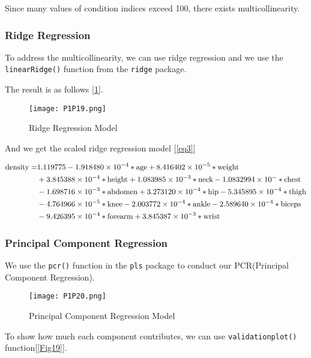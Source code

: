 \documentclass[11pt]{article}
\begin{document}
Since many values of condition indices exceed 100, there exists multicollinearity.

\subsubsection{Ridge Regression}

To address the multicollinearity, we can use ridge regression and we use the \verb|linearRidge()| function from the \verb|ridge| package.

The result is as follows [\ref{Fig16}].

\begin{figure}[!htb]
\centering
\texttt{[image: P1P19.png]}
\caption{Ridge Regression Model}\label{Fig16}
\end{figure}

And we get the scaled ridge regression model [\ref{eq3}]
           
\begin{align}
	\text{density} = &1.119775-1.918480\times10^{-4} *\text{age}+8.416402\times 10^{-5}*\text{weight}\notag\\
	&+3.845388\times 10^{-4}*\text{height}+1.083985\times 10^{-3}*\text{neck}-1.0832994\times 10^{-} *\text{chest}\notag\\
	&-1.698716\times 10^{-3} *\text{abdomen}+3.273120\times 10^{-4}*\text{hip}-5.345895\times 10^{-4}*\text{thigh}\notag \\ 
    &-4.764966\times10^{-5}*\text{knee} -2.003772\times10^{-4}*\text{ankle}-2.589640\times 10^{-4}*\text{biceps}\notag\\
    &-9.426395\times 10^{-4}*\text{forearm}+3.845387\times10^{-3}*\text{wrist}\label{eq3}  
\end{align}


\subsubsection{Principal Component Regression}

We use the \verb|pcr()| function in the \verb|pls| package to conduct our PCR(Principal Component Regression).

\begin{figure}[!htb]
\centering
\texttt{[image: P1P20.png]}
\caption{Principal Component Regression Model}\label{Fig17}
\end{figure}

To show how much each component contributes, we can use \verb|validationplot()| function[\ref{Fig19}].
\end{document}

